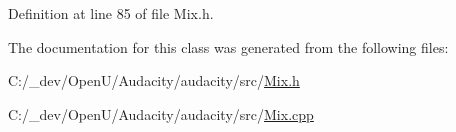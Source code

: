 Definition at line 85 of file Mix.\+h.



The documentation for this class was generated from the following files\+:\begin{DoxyCompactItemize}
\item 
C\+:/\+\_\+dev/\+Open\+U/\+Audacity/audacity/src/\hyperlink{_mix_8h}{Mix.\+h}\item 
C\+:/\+\_\+dev/\+Open\+U/\+Audacity/audacity/src/\hyperlink{_mix_8cpp}{Mix.\+cpp}\end{DoxyCompactItemize}
